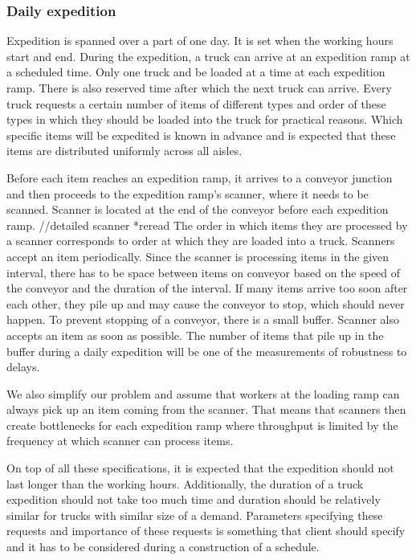 \documentclass{ctuthesis}
\begin{document}
\subsubsection{Daily expedition}
Expedition is spanned over a part of one day. It is set when the working hours start and end. During the expedition, a truck can arrive at an expedition ramp at a scheduled time. Only one truck and be loaded at a time at each expedition ramp. There is also reserved time after which the next truck can arrive. Every truck requests a certain number of items of different types and order of these types in which they should be loaded into the truck for practical reasons. Which specific items will be expedited is known in advance and is expected that these items are distributed uniformly across all aisles. 

Before each item reaches an expedition ramp, it arrives to a conveyor junction and then proceeds to the expedition ramp's scanner, where it needs to be scanned. Scanner is located at the end of the conveyor before each expedition ramp. 
//detailed scanner *reread
The order in which items they are processed by a scanner corresponds to order at which they are loaded into a truck. Scanners accept an item periodically. Since the scanner is processing items in the given interval, there has to be space between items on conveyor based on the speed of the conveyor and the duration of the interval. If many items arrive too soon after each other, they pile up and may cause the conveyor to stop, which should never happen. To prevent stopping of a conveyor, there is a small buffer. Scanner also accepts an item as soon as possible. The number of items that pile up in the buffer during a daily expedition will be one of the measurements of robustness to delays.

We also simplify our problem and assume that workers at the loading ramp can always pick up an item coming from the scanner. That means that scanners then create bottlenecks for each expedition ramp where throughput is limited by the frequency at which scanner can process items.

On top of all these specifications, it is expected that the expedition should not last longer than the working hours. Additionally, the duration of a truck expedition should not take too much time and duration should be relatively similar for trucks with similar size of a demand. Parameters specifying these requests and importance of these requests is something that client should specify and it has to be considered during a construction of a schedule.
\end{document}

